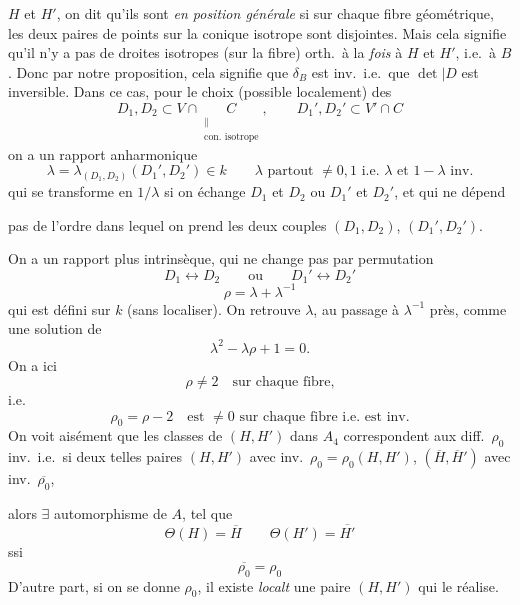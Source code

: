 \documentclass[11pt,a4paper]{article}
\begin{document}

$H$ et $H'$, on dit qu'ils sont \emph{en position générale} si sur chaque fibre géométrique, les deux paires de points sur la conique isotrope sont disjointes. Mais cela signifie  qu'il n'y a pas de droites isotropes (sur la fibre) orth.\ à la \emph{fois} à $H$ et $H'$, i.e.\ à $B$. Donc par notre proposition, cela signifie que $\delta_{B}$ est inv.\ i.e.\ que $\det|D$ est inversible. \struck{\ill{}} Dans ce cas,   pour le choix (possible localement) des  
\[
D_{1},D_{2}\subset V\cap \underset{\substack{\parallel\\ \text{con.\ isotrope}}}{C},\qquad D_{1}',D_{2}'\subset V'\cap C
\]
on a un rapport anharmonique
\[
\lambda=\lambda_{(D_{1},D_{2})}(D_{1}',D_{2}')\in k \qquad \lambda \text{ partout } \neq 0,1 \text{ i.e. } \lambda \text{ et } 1-\lambda \text{ inv.}
\]
qui se transforme en $1/\lambda$ si on échange $D_{1}$ et $D_{2}$ ou $D_{1}'$ et $D_{2}'$, et qui ne dépend

pas de l'ordre dans lequel on prend les deux  couples $(D_{1},D_{2})$, $(D_{1}',D_{2}')$.

On a un rapport plus intrinsèque, qui ne change pas par permutation
\[
D_{1}\longleftrightarrow D_{2} \qquad\text{ou}\qquad D_{1}'\longleftrightarrow D_{2}'
\]
\[
\rho=\lambda+\lambda^{-1}
\]
qui est défini sur $k$ (sans localiser). On retrouve $\lambda$, au passage à $\lambda^{-1}$ près, comme une solution de
\[
\lambda^{2}-\lambda\rho+1=0 .
\]
 On a ici
\[
\rho\neq 2 \quad\text{sur chaque fibre,}
\]
i.e.
\[
\rho_{0}=\rho-2 \quad\text{est }\neq 0\text{ sur chaque fibre i.e.\ est inv.}
\]
On voit  aisément que les classes de   $(H,H')$  dans $A_{4}$  correspondent aux diff.\ $\rho_{0}$ inv.\ i.e.\ si deux telles paires $(H,H')$ avec inv.\ $\rho_{0}=\rho_{0}(H,H')$, $(\overline{H},\overline{H}')$ avec inv.\ $\overline{\rho_{0}}$,

alors $\exists$  \add{$\Theta$} automorphisme \struck{\ill{}} de $A$, tel que
\[
\Theta(H)=\overline{H} \qquad \Theta(H')=\overline{H'}
\]
ssi
\[
\overline{\rho_{0}}=\rho_{0}
\]
D'autre part, si on se donne $\rho_{0}$,  il existe \emph{localt} une paire $(H,H')$ qui le réalise.
\end{document}
